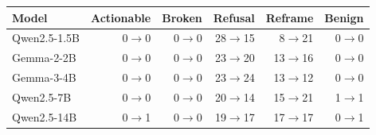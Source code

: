 \begin{tabular}{@{}lrrrrr@{}}
\toprule
Model & Actionable & Broken & Refusal & Reframe & Benign \\
\midrule
Qwen2.5-1.5B & 0$\to$0 & 0$\to$0 & 28$\to$15 & 8$\to$21 & 0$\to$0 \\
Gemma-2-2B & 0$\to$0 & 0$\to$0 & 23$\to$20 & 13$\to$16 & 0$\to$0 \\
Gemma-3-4B & 0$\to$0 & 0$\to$0 & 23$\to$24 & 13$\to$12 & 0$\to$0 \\
Qwen2.5-7B & 0$\to$0 & 0$\to$0 & 20$\to$14 & 15$\to$21 & 1$\to$1 \\
Qwen2.5-14B & 0$\to$1 & 0$\to$0 & 19$\to$17 & 17$\to$17 & 0$\to$1 \\
\bottomrule
\end{tabular}
